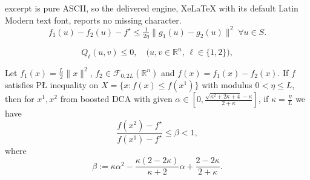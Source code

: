 \documentclass[10pt,a4paper]{amsart}
\renewcommand{\leq}{\leqslant}
\begin{document}
excerpt is pure ASCII, so the delivered engine, XeLaTeX with its default Latin Modern text font, reports no missing character.
\begin{equation}
\label{PL constraint}
f_1(u) - f_2(u) -f^\star \leq \tfrac{1}{2\eta} \| g_1(u) - g_2(u)\|^2 \; \forall u \in S.
\end{equation}

\begin{equation}
Q_\ell(u,v) \le 0, \quad \mbox{($u,v \in \mathbb{R}^n$,   $\ell \in \{1,2\}$)},
\label{eq:interpolation constraints}
\end{equation}

\begin{theorem}
\label{thm:GD PL}
Let $f_1(x)=\frac{L}{2}\|x\|^2$, $f_2\in\mathcal{F}_{0, 2L}({\mathbb{R}^n})$ and $f(x)=f_1(x)-f_2(x)$. If
     $f$ satisfies P{\L} inequality on $X=\{x: f(x)\leq f(x^1)\}$ with modulus $0<\eta\leq L$, then for $x^1, x^2$  from boosted DCA with given
      $\alpha \in \left[0, \frac{\sqrt{\kappa^2 + 2\kappa +4}-\kappa}{2+ \kappa} \right]$,
      if $\kappa=\frac{\eta}{L}$ we have
\[
\frac{f(x^2)-f^\star}{f(x^1)-f^\star}\leq \beta < 1,
\]
where
\begin{equation}
\label{def:beta}
    \beta := \kappa \alpha^2 - \frac{\kappa(2-2\kappa)}{\kappa+2}\alpha + \frac{2-2\kappa}{2+\kappa}.
\end{equation}

\end{theorem}
\end{document}
